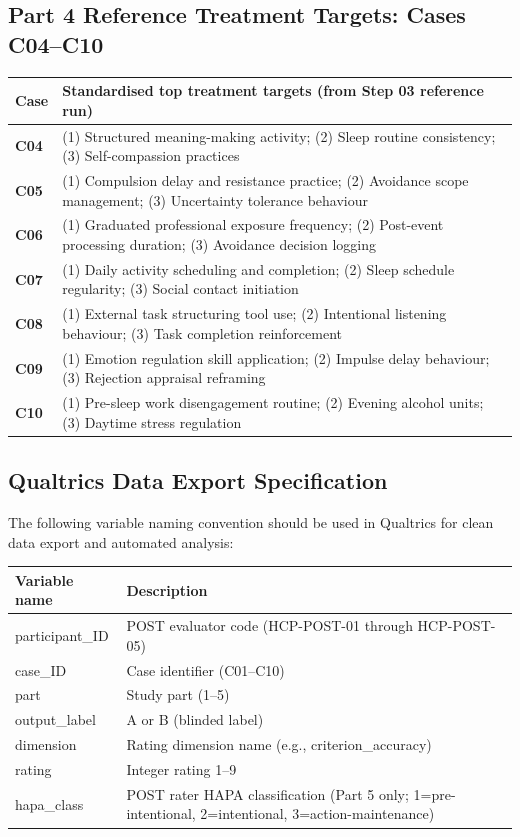 \documentclass[11pt,a4paper]{article}
\begin{document}
\vspace{0.8em}
\subsection*{Part 4 Reference Treatment Targets: Cases C04--C10}

\begin{tabular}{@{}>{\bfseries\color{PrimaryBlue}}p{}p{}@{}}
\toprule
\textbf{Case} & \textbf{Standardised top treatment targets (from Step 03 reference run)} \\
\midrule
C04 & (1) Structured meaning-making activity; (2) Sleep routine consistency; (3) Self-compassion practices \\
C05 & (1) Compulsion delay and resistance practice; (2) Avoidance scope management; (3) Uncertainty tolerance behaviour \\
C06 & (1) Graduated professional exposure frequency; (2) Post-event processing duration; (3) Avoidance decision logging \\
C07 & (1) Daily activity scheduling and completion; (2) Sleep schedule regularity; (3) Social contact initiation \\
C08 & (1) External task structuring tool use; (2) Intentional listening behaviour; (3) Task completion reinforcement \\
C09 & (1) Emotion regulation skill application; (2) Impulse delay behaviour; (3) Rejection appraisal reframing \\
C10 & (1) Pre-sleep work disengagement routine; (2) Evening alcohol units; (3) Daytime stress regulation \\
\bottomrule
\end{tabular}

\vspace{0.8em}
\subsection*{Qualtrics Data Export Specification}

The following variable naming convention should be used in Qualtrics for clean data export and automated analysis:

\small
\begin{tabular}{@{}>{\ttfamily}p{}p{}@{}}
\toprule
\textbf{Variable name} & \textbf{Description} \\
\midrule
participant\_ID & POST evaluator code (HCP-POST-01 through HCP-POST-05) \\
case\_ID & Case identifier (C01--C10) \\
part & Study part (1--5) \\
output\_label & A or B (blinded label) \\
dimension & Rating dimension name (e.g., criterion\_accuracy) \\
rating & Integer rating 1--9 \\
hapa\_class & POST rater HAPA classification (Part 5 only; 1=pre-intentional, 2=intentional, 3=action-maintenance) \\
\bottomrule
\end{tabular}
\end{document}
